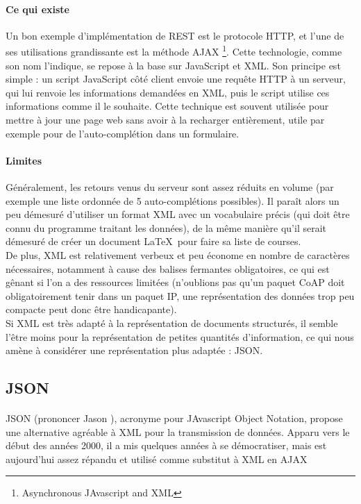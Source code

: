 \documentclass[a4paper,11pt]{article}
\begin{document}
\paragraph{Ce qui existe}
Un bon exemple d'implémentation de REST est le protocole HTTP, et l'une de ses utilisations grandissante est la méthode AJAX \footnote{Asynchronous JAvascript and XML}. Cette technologie, comme son nom l'indique, se repose à la base sur JavaScript et XML. Son principe est simple : un script JavaScript côté client envoie une requête HTTP à un serveur, qui lui renvoie les informations demandées en XML, puis le script utilise ces informations comme il le souhaite. Cette technique est souvent utilisée pour mettre à jour une page web sans avoir à la recharger entièrement, utile par exemple pour de l'auto-complétion dans un formulaire.


\paragraph{Limites}
Généralement, les retours venus du serveur sont assez réduits en volume (par exemple une liste ordonnée de 5 auto-complétions possibles). Il paraît alors un peu démesuré d'utiliser un format XML avec un vocabulaire précis (qui doit être connu du programme traitant les données), de la même manière qu'il serait démesuré de créer un document \LaTeX~pour faire sa liste de courses.\\
De plus, XML est relativement verbeux et peu économe en nombre de caractères nécessaires, notamment à cause des balises fermantes obligatoires, ce qui est gênant si l'on a des ressources limitées (n'oublions pas qu'un paquet CoAP doit obligatoirement tenir dans un paquet IP, une représentation des données trop peu compacte peut donc être handicapante).\\

Si XML est très adapté à la représentation de documents structurés, il semble l'être moins pour la représentation de petites quantités d'information, ce qui nous amène à considérer une représentation plus adaptée : JSON.



\subsection{JSON}

\paragraph*{}
JSON (prononcer \og Jason \fg), acronyme pour JAvascript Object Notation, propose une alternative agréable à XML pour la transmission de données. Apparu vers le début des années 2000, il a mis quelques années à se démocratiser, mais est aujourd'hui assez répandu et utilisé comme substitut à XML en AJAX
\end{document}
